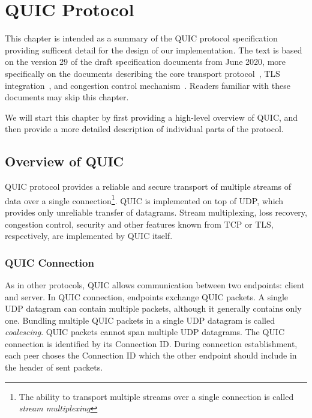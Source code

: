 
\chapter{QUIC Protocol}\label{chap:02-quic}

This chapter is intended as a summary of the QUIC protocol specification providing sufficent detail
for the design of our implementation. The text is based on the version 29 of the draft specification
documents from June 2020, more specifically on the documents describing the core transport
protocol~\cite{draft-ietf-quic-transport}, TLS integration~\cite{draft-ietf-quic-tls}, and
congestion control mechanism~\cite{draft-ietf-quic-recovery}. Readers familiar with these documents
may skip this chapter.

We will start this chapter by first providing a high-level overview of QUIC, and then provide a more
detailed description of individual parts of the protocol.

\section{Overview of QUIC}

QUIC protocol provides a reliable and secure transport of multiple streams of data over a single
connection\footnote{The ability to transport multiple streams over a single connection is called
  \textit{stream multiplexing}}. QUIC is implemented on top of UDP, which provides only unreliable
transfer of datagrams. Stream multiplexing, loss recovery, congestion control, security and other
features known from TCP or TLS, respectively, are implemented by QUIC itself.

\subsection{QUIC Connection}
As in other protocols, QUIC allows communication between two endpoints: client and server. In QUIC
connection, endpoints exchange QUIC packets. A single UDP datagram can contain multiple packets,
although it generally contains only one. Bundling multiple QUIC packets in a single UDP datagram is
called \textit{coalescing}. QUIC packets cannot span multiple UDP datagrams. The QUIC connection is
identified by its Connection ID\@.  During connection establishment, each peer choses the Connection
ID which the other endpoint should include in the header of sent packets.

